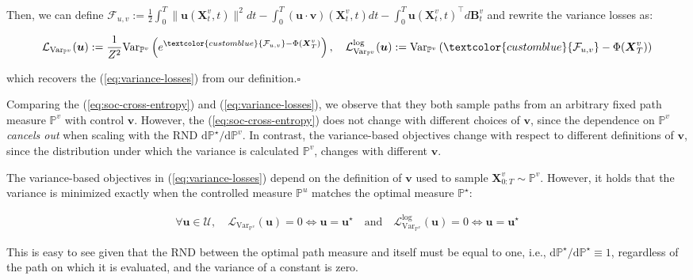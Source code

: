 \documentclass{article}
\newcommand{\bluetext}[1]{\textcolor{customblue}{#1}}
\begin{document}
Then, we can define $\mathcal{F}_{u,v}:=\frac{1}{2}\int_0^T\|\boldsymbol{u}(\boldsymbol{X}^v_t,t)\|^2dt-\int_0^T(\boldsymbol{u}\cdot\boldsymbol{v}) (\boldsymbol{X}^v_t,t)dt-\int_0^T\boldsymbol{u}(\boldsymbol{X}^v_t,t)^\top d\boldsymbol{B}^v_t$ and rewrite the variance losses as:
\begin{small}
\begin{align}
    \mathcal{L}_{\text{Var}_{\mathbb{P}^v}}(\boldsymbol{u}):=\frac{1}{Z^2}\text{Var}_{\mathbb{P}^v}\left(e^{\bluetext{\mathcal{F}_{u,v}}-\Phi(\boldsymbol{X}_T^v)}\right), \quad\mathcal{L}^{\text{log}}_{\text{Var}_{\mathbb{P}^v}}(\boldsymbol{u}):=\text{Var}_{\mathbb{P}^v}\left(\bluetext{\mathcal{F}_{u,v}}-\Phi(\boldsymbol{X}_T^v)\right)
\end{align}
\end{small}
which recovers the (\ref{eq:variance-losses}) from our definition.\hfill $\square$

Comparing the (\ref{eq:soc-cross-entropy}) and (\ref{eq:variance-losses}), we observe that they both sample paths from an arbitrary fixed path measure $\mathbb{P}^v$ with control $\boldsymbol{v}$. However, the (\ref{eq:soc-cross-entropy}) does not change with different choices of $\boldsymbol{v}$, since the dependence on $\mathbb{P}^v$ \textit{cancels out} when scaling with the RND $\mathrm{d}\mathbb{P}^\star/\mathrm{d}\mathbb{P}^v$. In contrast, the variance-based objectives change with respect to different definitions of $\boldsymbol{v}$, since the distribution under which the variance is calculated $\mathbb{P}^v$, changes with different $\boldsymbol{v}$.

\begin{remark}
    The variance-based objectives in (\ref{eq:variance-losses}) depend on the definition of $\boldsymbol{v}$ used to sample $\boldsymbol{X}_{0:T}^v\sim \mathbb{P}^v$. However, it holds that the variance is minimized exactly when the controlled measure $\mathbb{P}^u$ matches the optimal measure $\mathbb{P}^\star$:
    \begin{small}
    \begin{align}
        \forall \boldsymbol{u}\in \mathcal{U}, \quad \mathcal{L}_{\text{Var}_{\mathbb{P}^v}}(\boldsymbol{u})=0 \iff\boldsymbol{u}=\boldsymbol{u}^\star\quad\text{and}\quad \mathcal{L}^{\text{log}}_{\text{Var}_{\mathbb{P}^v}}(\boldsymbol{u})=0 \iff\boldsymbol{u}=\boldsymbol{u}^\star
    \end{align}
    \end{small}
    This is easy to see given that the RND between the optimal path measure and itself must be equal to one, i.e.,  $\mathrm{d}\mathbb{P}^\star/\mathrm{d}\mathbb{P}^\star\equiv 1$, regardless of the path on which it is evaluated, and the variance of a constant is zero.
\end{remark}
\end{document}

